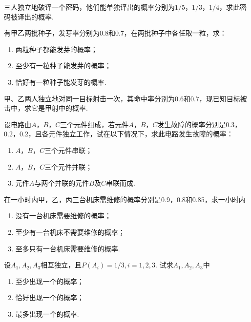 \begin{xiti}
  \item 三人独立地破译一个密码，他们能单独译出的概率分别为$1/5$，$1/3$，$1/4$，求此密码被译出的概率.

  \item 有甲乙两批种子，发芽率分别为0.8和0.7，在两批种子中各任取一粒，求：
      \begin{enumerate}
        \item 两粒种子都能发芽的概率；
        \item 至少有一粒种子能发芽的概率；
        \item 恰好有一粒种子能发芽的概率.
      \end{enumerate}

  \item 甲、乙两人独立地对同一目标射击一次，其命中率分别为0.6和0.7，现已知目标被击中，求它是甲射中的概率.

  \item 设电路由$A$，$B$，$C$三个元件组成，若元件$A$，$B$，$C$发生故障的概率分别是0.3，0.2，0.2，且各元件独立工作，试在以下情况下，求此电路发生故障的概率：
      \begin{enumerate}
        \item $A$，$B$，$C$三个元件串联；
        \item $A$，$B$，$C$三个元件并联；
        \item 元件$A$与两个并联的元件$B$及$C$串联而成.
      \end{enumerate}

  \item 在一小时内甲，乙，丙三台机床需维修的概率分别是0.9，0.8和0.85，求一小时内
      \begin{enumerate}
        \item 没有一台机床需要维修的概率；
        \item 至少有一台机床不需要维修的概率；
        \item 至多只有一台机床需要维修的概率.
      \end{enumerate}

  \item 设$A_1,A_2,A_3$相互独立，且$P(A_i)=1/3,i=1,2,3$. 试求$A_1,A_2,A_3$中
      \begin{enumerate}
        \item 至少出现一个的概率；
        \item 恰好出现一个的概率；
        \item 最多出现一个的概率.
      \end{enumerate}


\end{xiti}
